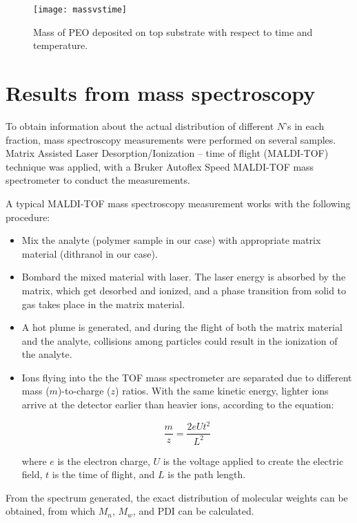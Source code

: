 \begin{figure}[H]
\center
\texttt{[image: massvstime]}
\caption{Mass of PEO deposited on top substrate with respect to time and temperature.}
\label{fig:massvstime}
\end{figure}

\section{Results from mass spectroscopy}

To obtain information about the actual distribution of different $N$'s in each fraction, mass spectroscopy measurements were performed on several samples. Matrix Assisted Laser Desorption/Ionization – time of flight (MALDI-TOF) technique was applied, with a Bruker Autoflex Speed MALDI-TOF mass spectrometer to conduct the measurements.

A typical MALDI-TOF mass spectroscopy measurement works with the following procedure:

\begin{itemize}
\item Mix the analyte (polymer sample in our case) with appropriate matrix material (dithranol in our case).
\item Bombard the mixed material with laser. The laser energy is absorbed by the matrix, which get desorbed and ionized, and a phase transition from solid to gas takes place in the matrix material.
\item A hot plume is generated, and during the flight of both the matrix material and the analyte, collisions among particles could result in the ionization of the analyte.
\item Ions flying into the the TOF mass spectrometer are separated due to different mass ($m$)-to-charge ($z$) ratios. With the same kinetic energy, lighter ions arrive at the detector earlier than heavier ions, according to the equation:

\begin{equation}
\label{eqn_MALDI}
\dfrac{m}{z} = \dfrac{2eUt^{2}}{L^{2}}
\end{equation}

\noindent
where $e$ is the electron charge, $U$ is the voltage applied to create the electric field, $t$ is the time of flight, and $L$ is the path length.
\end{itemize}

From the spectrum generated, the exact distribution of molecular weights can be obtained, from which $M_{n}$, $M_{w}$, and PDI can be calculated.


